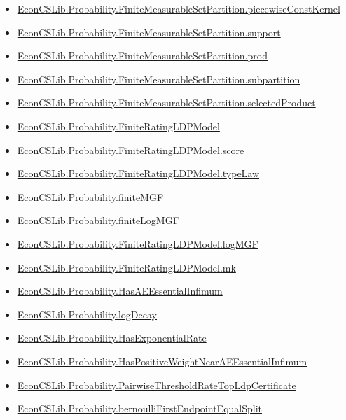 \documentclass[10pt]{article}
\begin{document}
\begin{itemize}[leftmargin=1.2em]
\begin{itemize}[leftmargin=1.2em]
\item \hyperlink{library-prerequisite-a2c998741ee4703f}{EconCSLib.Probability.FiniteMeasurableSetPartition.piecewiseConstKernel}
\item \hyperlink{library-prerequisite-a9f78bbf3e21bb13}{EconCSLib.Probability.FiniteMeasurableSetPartition.support}
\item \hyperlink{library-prerequisite-3161aa1be2e11c39}{EconCSLib.Probability.FiniteMeasurableSetPartition.prod}
\item \hyperlink{library-prerequisite-e99ffb1d85bad07e}{EconCSLib.Probability.FiniteMeasurableSetPartition.subpartition}
\item \hyperlink{library-prerequisite-cb9e54451ad9288c}{EconCSLib.Probability.FiniteMeasurableSetPartition.selectedProduct}
\item \hyperlink{library-prerequisite-943d19d91afe6d63}{EconCSLib.Probability.FiniteRatingLDPModel}
\item \hyperlink{library-prerequisite-c3203b699a19e900}{EconCSLib.Probability.FiniteRatingLDPModel.score}
\item \hyperlink{library-prerequisite-fc314aabfaabee42}{EconCSLib.Probability.FiniteRatingLDPModel.typeLaw}
\item \hyperlink{library-prerequisite-6258b3da52471ab5}{EconCSLib.Probability.finiteMGF}
\item \hyperlink{library-prerequisite-20dbd208a81d9e80}{EconCSLib.Probability.finiteLogMGF}
\item \hyperlink{library-prerequisite-c959d6e7b586c2bc}{EconCSLib.Probability.FiniteRatingLDPModel.logMGF}
\item \hyperlink{library-prerequisite-bd97fc0d50344aa7}{EconCSLib.Probability.FiniteRatingLDPModel.mk}
\item \hyperlink{library-prerequisite-d169ba913523821f}{EconCSLib.Probability.HasAEEssentialInfimum}
\item \hyperlink{library-prerequisite-94743506c5de049b}{EconCSLib.Probability.logDecay}
\item \hyperlink{library-prerequisite-380666720005662c}{EconCSLib.Probability.HasExponentialRate}
\item \hyperlink{library-prerequisite-e43b036a6f31f38f}{EconCSLib.Probability.HasPositiveWeightNearAEEssentialInfimum}
\item \hyperlink{library-prerequisite-2f4464ce60bae569}{EconCSLib.Probability.PairwiseThresholdRateTopLdpCertificate}
\item \hyperlink{library-prerequisite-479fa520bc58d797}{EconCSLib.Probability.bernoulliFirstEndpointEqualSplit}

\end{itemize}
\end{itemize}
\end{document}
